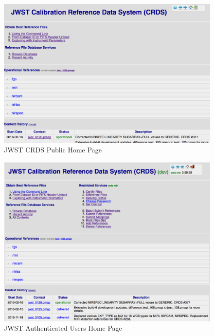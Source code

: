 \documentclass[final,authoryear,5p,times,twocolumn]{elsarticle}
\begin{document}
\begin{figure}[ht!]
\centering
\includegraphics[width=180mm]{JWST_Public_Home_Page.png}
\caption{JWST CRDS Public Home Page}
\label{fig:publichome}
\end{figure}

\begin{figure}[ht!]
\centering
\includegraphics[width=180mm]{JWST_Authenticated_Home.png}
\caption{JWST Authenticated Users Home Page}
\label{fig:authenticatedhome}
\end{figure}
\end{document}
